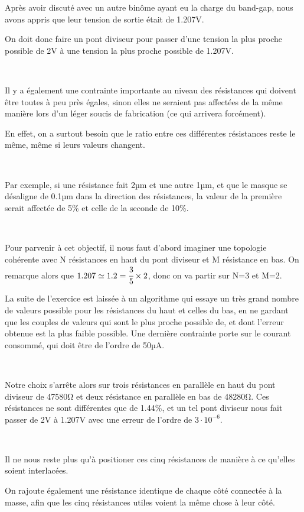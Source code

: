 \documentclass{article}
\begin{document}
Après avoir discuté avec un autre binôme ayant eu la charge du band-gap, nous avons appris que leur tension de sortie était de 1.207V.

On doit donc faire un pont diviseur pour passer d’une tension la plus proche possible de 2V à une tension la plus proche possible de 1.207V.

~

Il y a également une contrainte importante au niveau des résistances qui doivent être toutes à peu près égales, sinon elles ne seraient pas affectées de la même manière lors d’un léger soucis de fabrication (ce qui arrivera forcément).

En effet, on a surtout besoin que le ratio entre ces différentes résistances reste le même, même si leurs valeurs changent.

~

Par exemple, si une résistance fait 2µm et une autre 1µm, et que le masque se désaligne de 0.1µm dans la direction des résistances, la valeur de la première serait affectée de 5\% et celle de la seconde de 10\%.

~

Pour parvenir à cet objectif, il nous faut d’abord imaginer une topologie cohérente avec N résistances en haut du pont diviseur et M résistance en bas. On remarque alors que $1.207\simeq1.2=\cfrac{3}{5}\times2$, donc on va partir sur N=3 et M=2.

La suite de l’exercice est laissée à un algorithme qui essaye un très grand nombre de valeurs possible pour les résistances du haut et celles du bas, en ne gardant que les couples de valeurs qui sont le plus proche possible de, et dont l’erreur obtenue est la plus faible possible. Une dernière contrainte porte sur le courant consommé, qui doit être de l’ordre de 50µA.

~

Notre choix s’arrête alors sur trois résistances en parallèle en haut du pont diviseur de 47580Ω et deux résistance en parallèle en bas de 48280Ω. Ces résistances ne sont différentes que de 1.44\%, et un tel pont diviseur nous fait passer de 2V à 1.207V avec une erreur de l’ordre de $3\cdot 10^{-6}$.

~

Il ne nous reste plus qu’à positioner ces cinq résistances de manière à ce qu’elles soient interlacées.

On rajoute également une résistance identique de chaque côté connectée à la masse, afin que les cinq résistances utiles voient la même chose à leur côté.
\end{document}
